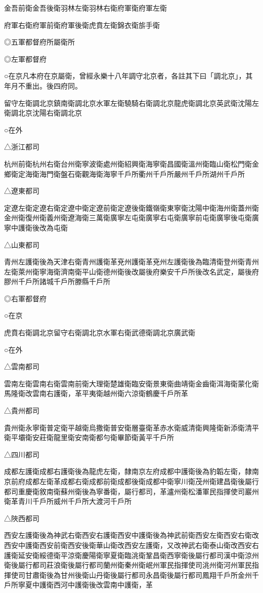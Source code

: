 金吾前衛金吾後衛羽林左衛羽林右衛府軍衛府軍左衛

府軍右衛府軍前衛府軍後衛虎賁左衛錦衣衛旂手衛

◎五軍都督府所屬衛所

◎左軍都督府

○在京凡本府在京屬衛，曾經永樂十八年調守北京者，各註其下曰「調北京」，其年月不重出。後四府同。

留守左衛調北京鎮南衛調北京水軍左衛驍騎右衛調北京龍虎衛調北京英武衛沈陽左衛調北京沈陽右衛調北京

○在外

△浙江都司

杭州前衛杭州右衛台州衛寧波衛處州衛紹興衛海寧衛昌國衛溫州衛臨山衛松門衛金鄉衛定海衛海門衛盤石衛觀海衛海寧千戶所衢州千戶所嚴州千戶所湖州千戶所

△遼東都司

定遼左衛定遼右衛定遼中衛定遼前衛定遼後衛鐵嶺衛東寧衛沈陽中衛海州衛蓋州衛金州衛復州衛義州衛遼海衛三萬衛廣寧左屯衛廣寧右屯衛廣寧前屯衛廣寧後屯衛廣寧中護衛後改為屯衛

△山東都司

青州左護衛後為天津右衛青州護衛革兗州護衛革兗州左護衛後為臨清衛登州衛青州左衛萊州衛寧海衛濟南衛平山衛德州衛後改屬後府樂安千戶所後改名武定，屬後府膠州千戶所諸城千戶所滕縣千戶所

◎右軍都督府

○在京

虎賁右衛調北京留守右衛調北京水軍右衛武德衛調北京廣武衛

○在外

△雲南都司

雲南左衛雲南右衛雲南前衛大理衛楚雄衛臨安衛景東衛曲靖衛金齒衛洱海衛蒙化衛馬隆衛改雲南右護衛，革平夷衛越州衛六涼衛鶴慶千戶所革

△貴州都司

貴州衛永寧衛普定衛平越衛烏撒衛普安衛層臺衛革赤水衛威清衛興隆衛新添衛清平衛平壩衛安莊衛龍里衛安南衛都勻衛畢節衛黃平千戶所

△四川都司

成都左護衛成都右護衛後為龍虎左衛，隸南京左府成都中護衛後為豹韜左衛，隸南京前府成都左衛革成都右衛成都前衛成都後衛成都中衛寧川衛茂州衛建昌衛後屬行都司重慶衛敘南衛蘇州衛後為寧番衛，屬行都司，革瀘州衛松潘軍民指揮使司巖州衛革青川千戶所威州千戶所大渡河千戶所

△陜西都司

西安左護衛後為神武右衛西安右護衛西安中護衛後為神武前衛西安左衛西安右衛改西安中護衛西安前衛西安後衛華山衛改西安左護衛，又改神武右衛泰山衛改西安右護衛延安衛綏德衛平涼衛慶陽衛寧夏衛臨洮衛鞏昌衛西寧衛後屬行都司漢中衛涼州衛後屬行都司莊浪衛後屬行都司蘭州衛秦州衛岷州軍民指揮使司洮州衛河州軍民指揮使司甘肅衛後為甘州後衛山丹衛後屬行都司永昌衛後屬行都司鳳翔千戶所金州千戶所寧夏中護衛西河中護衛後改雲南中護衛，革

